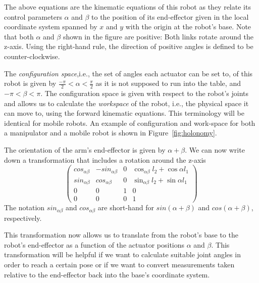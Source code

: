 The above equations are the kinematic equations of this robot as they relate its control parameters $ \alpha$ and $\beta$ to the position of its end-effector given in the local coordinate system spanned by $ x$ and $ y$ with the origin at the robot's base. Note that both $\alpha$ and $\beta$ shown in the figure are positive: Both links rotate around the z-axis. Using the right-hand rule, the direction of positive angles is defined to be counter-clockwise.

The \emph{configuration space},i.e., the set of angles each actuator can be set to, of this robot is given by $ \frac{-\pi}{2}<\alpha<\frac{\pi}{2}$ as it is not supposed to run into the table, and $ -\pi < \beta < \pi$. The configuration space is given with respect to the robot's joints and allows us to calculate the \emph{workspace} of the robot, i.e., the physical space it can move to, using the forward kinematic equations. This terminology will be identical for mobile robots. An example of configuration and work-space for both a manipulator and a mobile robot is shown in Figure~\ref{fig:holonomy}.

The orientation of the arm's end-effector is given by $\alpha+\beta$. We can now write down  a transformation that includes a rotation around the z-axis
\begin{equation}
\label{eq:2armtrans}
\left(\begin{array}{llll}cos_{\alpha\beta} & -sin_{\alpha\beta} &  0 & \cos_{\alpha\beta}l_2+\cos\alpha l_1\\
                        sin_{\alpha\beta} & cos_{\alpha\beta} & 0 & \sin_{\alpha\beta}l_2+\sin\alpha l_1\\
												0 & 0 & 1 & 0\\
												0 & 0 & 0 & 1\end{array}\right)
\end{equation}
The notation $sin_{\alpha\beta}$ and $cos_{\alpha\beta}$ are short-hand for $sin(\alpha+\beta)$ and $cos(\alpha+\beta)$, respectively.

This transformation now allows us to translate from the robot's base to the robot's end-effector as a function of the actuator positions $\alpha$ and $\beta$. This transformation will be helpful if we want to calculate suitable joint angles in order to reach a certain pose or if we want to convert measurements taken relative to the end-effector back into the base's coordinate system.

